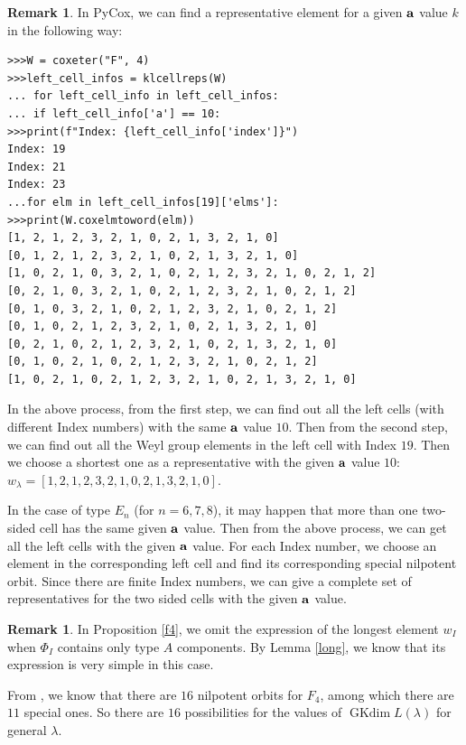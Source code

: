 \documentclass[reqno,12pt]{amsart}
\numberwithin{equation}{section}
\theoremstyle{plain}
\theoremstyle{definition}
\newtheorem{Rem}[Thm]{Remark}
\newcommand{\gkd}{\operatorname{GKdim}}
\begin{document}
\begin{Rem}\label{represent}
    In PyCox, we can find a representative element for a given $\bf a$ value $k$ in the following way:
    \begin{verbatim}
>>>W = coxeter("F", 4)
>>>left_cell_infos = klcellreps(W)
... for left_cell_info in left_cell_infos:
... if left_cell_info['a'] == 10:
>>>print(f"Index: {left_cell_info['index']}")
Index: 19
Index: 21
Index: 23
...for elm in left_cell_infos[19]['elms']:
>>>print(W.coxelmtoword(elm))
[1, 2, 1, 2, 3, 2, 1, 0, 2, 1, 3, 2, 1, 0]
[0, 1, 2, 1, 2, 3, 2, 1, 0, 2, 1, 3, 2, 1, 0]
[1, 0, 2, 1, 0, 3, 2, 1, 0, 2, 1, 2, 3, 2, 1, 0, 2, 1, 2]
[0, 2, 1, 0, 3, 2, 1, 0, 2, 1, 2, 3, 2, 1, 0, 2, 1, 2]
[0, 1, 0, 3, 2, 1, 0, 2, 1, 2, 3, 2, 1, 0, 2, 1, 2]
[0, 1, 0, 2, 1, 2, 3, 2, 1, 0, 2, 1, 3, 2, 1, 0]
[0, 2, 1, 0, 2, 1, 2, 3, 2, 1, 0, 2, 1, 3, 2, 1, 0]
[0, 1, 0, 2, 1, 0, 2, 1, 2, 3, 2, 1, 0, 2, 1, 2]
[1, 0, 2, 1, 0, 2, 1, 2, 3, 2, 1, 0, 2, 1, 3, 2, 1, 0]    
\end{verbatim}
In the above process, from the first step, we can find out all the left cells (with different Index numbers) with the same $\bf a$ value $10$. Then from the second step, we can find out all the Weyl group elements in the left cell with Index $19$. Then we choose a shortest one as a representative with the given $\bf a$ value $10$: $w_{\lambda}=[1, 2, 1, 2, 3, 2, 1, 0, 2, 1, 3, 2, 1, 0]$.

In the case of type $E_n$ (for $n=6,7,8$), it may happen that more than one two-sided cell has the same given $\bf a$ value. Then from the above process, we can get all the left cells with the  given $\bf a$ value. For each Index number, we choose an element in the corresponding left cell and find its corresponding special nilpotent orbit. Since there are finite Index numbers, we can give a complete set of representatives for the two sided cells  with the given $\bf a$ value. 
\end{Rem}





\begin{Rem}
    In Proposition \ref{f4}, we omit the expression of the longest element $w_I$ when $\Phi_I$ contains only type $A$ components. By Lemma \ref{long}, we know that its expression is very simple in this case.
\end{Rem}

From \cite[\S 8.4]{CM}, we know that there are $16$ nilpotent orbits for $F_4$, among which there are $11$ special ones. So there are $16$ possibilities for the values of $\gkd L(\lambda)$ for general $\lambda$.
\end{document}
